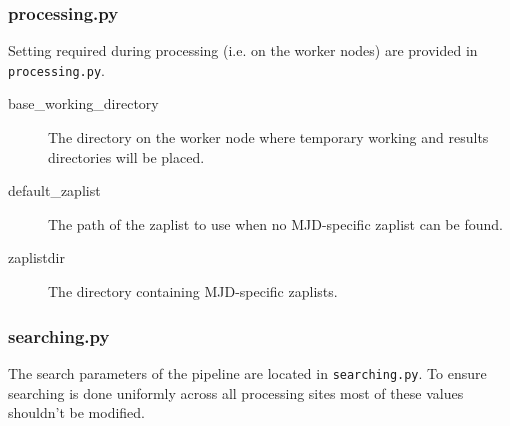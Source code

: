\documentclass[12pt]{article}
\begin{document}
\subsubsection{processing.py}
Setting required during processing (i.e. on the worker nodes) are provided in \texttt{processing.py}.

\begin{description}
    \item[base\_working\_directory] The directory on the worker node where temporary working and results directories will be placed.
    \item[default\_zaplist] The path of the zaplist to use when no MJD-specific zaplist can be found.
    \item[zaplistdir] The directory containing MJD-specific zaplists.
\end{description}


\subsubsection{searching.py}
The search parameters of the pipeline are located in \texttt{searching.py}. To ensure searching is done uniformly across all processing sites most of these values shouldn't be modified.
\end{document}
